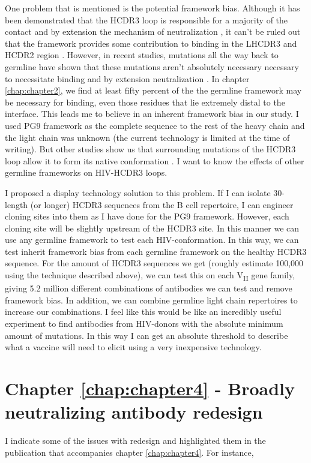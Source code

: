One problem that is mentioned is the potential framework bias. Although it has been demonstrated that the HCDR3 loop is responsible for a majority of the contact and by extension the mechanism of neutralization \citep{Pejchal:2010fp,Pancera:2010hh}, it can't be ruled out that the framework provides some contribution to binding in the LHCDR3 and HCDR2 region \citep{McLellan:2011dg}. However, in recent studies, mutations all the way back to germline have shown that these mutations aren't absolutely necessary necessary to necessitate binding and by extension neutralization \citep{Klein:2013iz}. In chapter \ref{chap:chapter2}, we find at least fifty percent of the the germline framework may be necessary for binding, even those residues that lie extremely distal to the interface. This leads me to believe in an inherent framework bias in our study. I used PG9 framework as the complete sequence to the rest of the heavy chain and the light chain was unknown (the current technology is limited at the time of writing). But other studies show us that surrounding mutations of the HCDR3 loop allow it to form its native conformation \citep{Wong:2011ff}. I want to know the effects of other germline frameworks on HIV-\naive HCDR3 loops.

I proposed a display technology solution to this problem. If I can isolate 30-length (or longer) HCDR3 sequences from the B cell repertoire, I can engineer cloning sites into them as I have done for the PG9 framework. However, each cloning site will be slightly upstream of the HCDR3 site. In this manner we can use any germline framework to test each HIV-\naive conformation. In this way, we can test inherit framework bias from each germline framework on the healthy HCDR3 sequence. For the amount of HCDR3 sequences we get (roughly estimate 100,000 using the technique described above), we can test this on each V\textsubscript{H} gene family, giving 5.2 million different combinations of antibodies we can test and remove framework bias. In addition, we can combine germline light chain repertoires to increase our combinations. I feel like this would be like an incredibly useful experiment to find antibodies from HIV-\naive donors with the absolute minimum amount of mutations. In this way I can get an absolute threshold to describe what a vaccine will need to elicit using a very inexpensive technology.

\section{Chapter \ref{chap:chapter4} - Broadly neutralizing antibody redesign}
I indicate some of the issues with redesign and highlighted them in the publication that accompanies chapter \ref{chap:chapter4}. For instance, \rosettadesign

